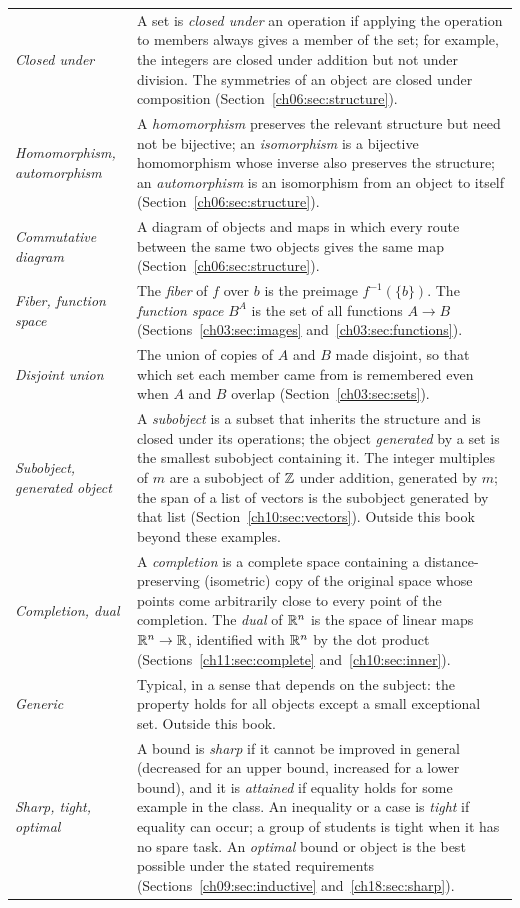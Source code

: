 \begin{longtable}{@{}>{\raggedright\arraybackslash}p{1.35in}>{\raggedright\arraybackslash}p{3.85in}@{}}
\emph{Closed under} & A set is \emph{closed under} an operation if applying the operation to members always gives a member of the set; for example, the integers are closed under addition but not under division. The symmetries of an object are closed under composition (Section~\ref{ch06:sec:structure}).\\
\emph{Homomorphism, automorphism} & A \emph{homomorphism} preserves the relevant structure but need not be bijective; an \emph{isomorphism} is a bijective homomorphism whose inverse also preserves the structure; an \emph{automorphism} is an isomorphism from an object to itself (Section~\ref{ch06:sec:structure}).\\
\emph{Commutative diagram} & A diagram of objects and maps in which every route between the same two objects gives the same map (Section~\ref{ch06:sec:structure}).\\
\emph{Fiber, function space} & The \emph{fiber} of $f$ over $b$ is the preimage $f^{-1}(\{b\})$. The \emph{function space} $B^A$ is the set of all functions $A\to B$ (Sections~\ref{ch03:sec:images} and~\ref{ch03:sec:functions}).\\
\emph{Disjoint union} & The union of copies of $A$ and $B$ made disjoint, so that which set each member came from is remembered even when $A$ and $B$ overlap (Section~\ref{ch03:sec:sets}).\\
\emph{Subobject, generated object} & A \emph{subobject} is a subset that inherits the structure and is closed under its operations; the object \emph{generated} by a set is the smallest subobject containing it. The integer multiples of $m$ are a subobject of $\mathbb Z$ under addition, generated by $m$; the span of a list of vectors is the subobject generated by that list (Section~\ref{ch10:sec:vectors}). Outside this book beyond these examples.\\
\emph{Completion, dual} & A \emph{completion} is a complete space containing a distance-preserving (isometric) copy of the original space whose points come arbitrarily close to every point of the completion. The \emph{dual} of $\mathbb R^n$ is the space of linear maps $\mathbb R^n\to\mathbb R$, identified with $\mathbb R^n$ by the dot product (Sections~\ref{ch11:sec:complete} and~\ref{ch10:sec:inner}).\\
\emph{Generic} & Typical, in a sense that depends on the subject: the property holds for all objects except a small exceptional set. Outside this book.\\
\emph{Sharp, tight, optimal} & A bound is \emph{sharp} if it cannot be improved in general (decreased for an upper bound, increased for a lower bound), and it is \emph{attained} if equality holds for some example in the class. An inequality or a case is \emph{tight} if equality can occur; a group of students is tight when it has no spare task. An \emph{optimal} bound or object is the best possible under the stated requirements (Sections~\ref{ch09:sec:inductive} and~\ref{ch18:sec:sharp}).\\

\end{longtable}
